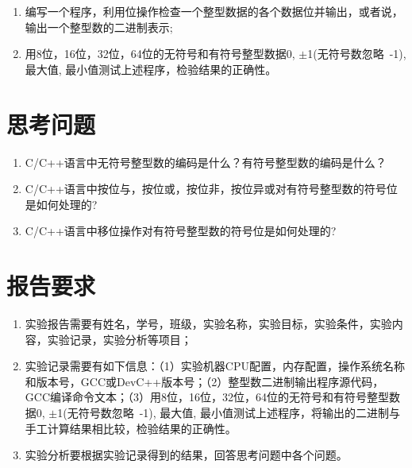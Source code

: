 \begin{enumerate}
	\item 编写一个程序，利用位操作检查一个整型数据的各个数据位并输出，或者说，输出一个整型数的二进制表示;
	\item 用8位，16位，32位，64位的无符号和有符号整型数据0, $\pm$1(无符号数忽略~-1), 最大值, 最小值测试上述程序，检验结果的正确性。
\end{enumerate}

\section{思考问题}

\begin{enumerate}
	\item C/C++语言中无符号整型数的编码是什么？有符号整型数的编码是什么？
	\item C/C++语言中按位与，按位或，按位非，按位异或对有符号整型数的符号位是如何处理的?
	\item C/C++语言中移位操作对有符号整型数的符号位是如何处理的?
\end{enumerate}

\section{报告要求}

\begin{enumerate}
	\item 实验报告需要有姓名，学号，班级，实验名称，实验目标，实验条件，实验内容，实验记录，实验分析等项目；
	\item 实验记录需要有如下信息：（1）实验机器CPU配置，内存配置，操作系统名称和版本号，GCC或DevC++版本号；（2）整型数二进制输出程序源代码，GCC编译命令文本；（3）用8位，16位，32位，64位的无符号和有符号整型数据0, $\pm$1(无符号数忽略~-1), 最大值, 最小值测试上述程序，将输出的二进制与手工计算结果相比较，检验结果的正确性。
	\item 实验分析要根据实验记录得到的结果，回答思考问题中各个问题。
\end{enumerate}

